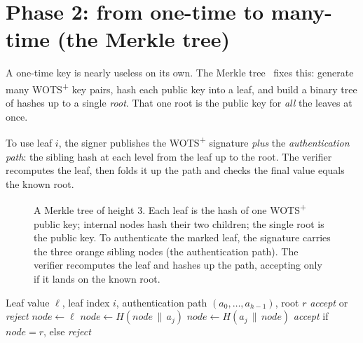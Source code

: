 \section{Phase 2: from one-time to many-time (the Merkle tree)}

A one-time key is nearly useless on its own. The Merkle tree~\cite{merkle1987} fixes this: generate many WOTS\textsuperscript{+} key pairs, hash each public key into a leaf, and build a binary tree of hashes up to a single \emph{root}. That one root is the public key for \emph{all} the leaves at once.

To use leaf $i$, the signer publishes the WOTS\textsuperscript{+} signature \emph{plus} the \emph{authentication path}: the sibling hash at each level from the leaf up to the root. The verifier recomputes the leaf, then folds it up the path and checks the final value equals the known root.

\begin{figure}[H]
\centering
{}
\caption{A Merkle tree of height $3$. Each leaf is the hash of one WOTS\textsuperscript{+} public key; internal nodes hash their two children; the single root is the public key. To authenticate the marked leaf, the signature carries the three orange sibling nodes (the authentication path). The verifier recomputes the leaf and hashes up the path, accepting only if it lands on the known root.}
\label{fig:merkle}
\end{figure}

\begin{algorithm}[H]
\caption{Verify a Merkle authentication path}
\label{alg:merkle-path}
\begin{algorithmic}[1]
\Require Leaf value $\ell$, leaf index $i$, authentication path $(a_0,\dots,a_{h-1})$, root $r$
\Ensure \emph{accept} or \emph{reject}
\State $node \gets \ell$
    \State $node \gets H(node \,\|\, a_j)$ 
  \Else
    \State $node \gets H(a_j \,\|\, node)$ 
  \EndIf
\EndFor
\State \Return \emph{accept} if $node = r$, else \emph{reject}
\end{algorithmic}
\end{algorithm}

